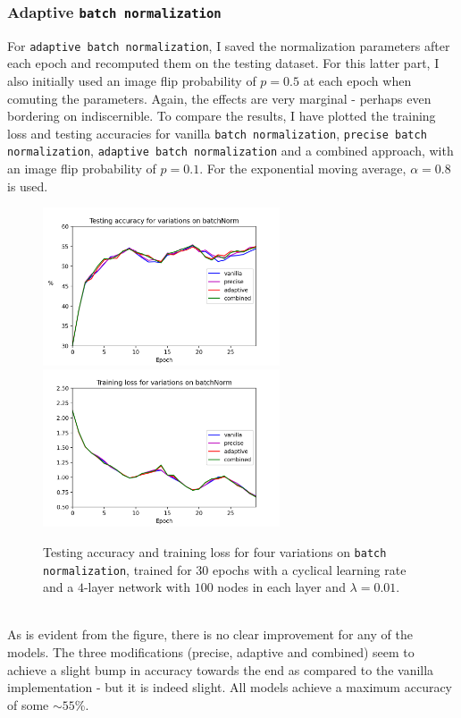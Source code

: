 \documentclass{article}
\begin{document}
\subsubsection*{Adaptive \texttt{batch normalization}}
	For \texttt{adaptive batch normalization}, I saved the normalization parameters after each epoch and recomputed them on the testing dataset. For this latter part, I also initially used an image flip probability of $p=0.5$ at each epoch when comuting the parameters. Again, the effects are very marginal - perhaps even bordering on indiscernible. To compare the results, I have plotted the training loss and testing accuracies for vanilla \texttt{batch normalization}, \texttt{precise batch normalization}, \texttt{adaptive batch normalization} and a combined approach, with an image flip probability of $p=0.1$. For the exponential moving average, $\alpha=0.8$ is used.
	\begin{figure}[h!]
		\centering
		\includegraphics[width=7cm]{../plots/acc_comp_bn.png}
		\includegraphics[width=7cm]{../plots/loss_comp_bn.png}	
		\caption{Testing accuracy and training loss for four variations on \texttt{batch normalization}, trained for $30$ epochs with a cyclical learning rate and a $4$-layer network with $100$ nodes in each layer and $\lambda = 0.01$.}
 	\end{figure}\\
	As is evident from the figure, there is no clear improvement for any of the models. The three modifications (precise, adaptive and combined) seem to achieve a slight bump in accuracy towards the end as compared to the vanilla implementation - but it is indeed slight. All models achieve a maximum accuracy of some $\sim55$\%. 
\end{document}
